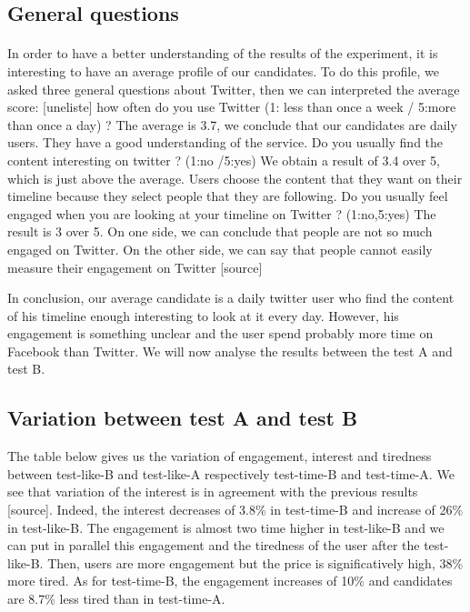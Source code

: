 \subsection{General questions}

\paragraph{}
In order to have a better understanding of the results of the experiment, it is interesting to have an average profile of our candidates. To do this profile, we asked three general questions about Twitter, then we can interpreted the average score:
[uneliste]
how often do you use Twitter (1: less than once a week / 5:more than once a day) ?
The average is 3.7, we conclude that our candidates are daily users. They have a good understanding of the service.
Do you usually find the content interesting on twitter ? (1:no /5:yes)
We obtain a result of 3.4 over 5, which is just above the average. Users choose the content that they want on their timeline because they select people that they are following.
Do you usually feel engaged when you are looking at your timeline on Twitter ? (1:no,5:yes)
The result is 3 over 5. On one side, we can conclude that people are not so much engaged on Twitter. On the other side, we can say that people cannot easily measure their engagement on Twitter [source]

In conclusion, our average candidate is a daily twitter user who find the content of his timeline enough interesting to look at it every day. However, his engagement is something unclear and the user spend probably more time on Facebook than Twitter. We will now analyse the results between the test A and test B.


\subsection{Variation between test A and test B}
The table below gives us the variation of engagement, interest and tiredness between test-like-B and test-like-A respectively test-time-B and test-time-A. We see that variation of the interest is in agreement with the previous results [source]. Indeed, the interest decreases of 3.8\% in test-time-B and increase of 26\% in test-like-B. The engagement is almost two time higher in test-like-B and we can put in parallel this engagement and the tiredness of the user after the test-like-B. Then, users are more engagement but the price is significatively high, 38\% more tired. As for test-time-B, the engagement increases of 10\% and candidates are 8.7\% less tired than in test-time-A. \\ \\

